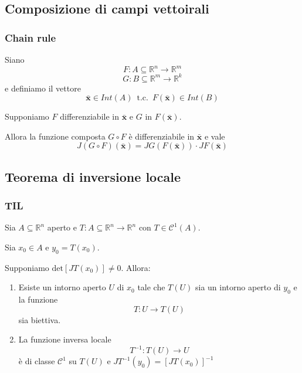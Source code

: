 \documentclass[x11names]{article}
\begin{document}
	\subsection{Composizione di campi vettoirali}
	\begin{center}
		\colorbox{myred}{\begin{minipage}{5.75in}
				\begin{redes}{}
					\subsubsection{\textbf{Chain rule}}
					Siano 
					\[
					F:A\subseteq \mathbb{R}^n \to \mathbb{R}^m
					\]
					\[
					G:B\subseteq \mathbb{R}^m \to \mathbb{R}^k
					\]
					e definiamo il vettore
					\[ 
					\boldsymbol{\bar{x}} \in Int(A) \;\ \text{t.c.} \;\ F(\boldsymbol{\bar{x}}) \in Int(B)
					\]
					
					Supponiamo \(F\) differenziabile in \(\boldsymbol{\bar{x}}\) e \(G\) in \(F(\boldsymbol{\bar{x}})\).
					
					Allora la funzione composta \(G\circ F\) è differenziabile in \(\boldsymbol{\bar{x}}\) e vale
					\[ 
					J(G\circ F)(\boldsymbol{\bar{x}}) = JG(F(\boldsymbol{\bar{x}})) \cdot JF(\boldsymbol{\bar{x}})
					\]
				\end{redes}
		\end{minipage}}        
	\end{center}

	\subsection{Teorema di inversione locale}
	\begin{center}
		\colorbox{myred}{\begin{minipage}{5.75in}
				\begin{redes}{}
					\subsubsection{\textbf{TIL}}
					Sia \(A \subseteq \mathbb{R}^n\) aperto e \(T:A\subseteq \mathbb{R}^n \to \mathbb{R}^n\) con \(T\in \mathcal{C}^1(A)\). 
					
					Sia \(x_{0} \in A\) e \(y_{0} = T(x_{0})\).
					
					Supponiamo \(\text{det}\left[JT(x_{0})\right] \neq 0\). Allora:
					\begin{enumerate}
						\item Esiste un intorno aperto \(U\) di \(x_{0}\) tale che \(T(U)\) sia un intorno aperto di \(y_{0}\) e la funzione
						\[ 
						T: U \to T(U)
						\]
						sia biettiva.
						\item La funzione inversa locale 
						\[ 
						T^{-1}: T(U) \to U
						\]
						è di classe \(\mathcal{C}^1\) su \(T(U)\) e \(JT^{-1}(y_{0}) = \left[JT(x_{0})\right]^{-1}\)
					\end{enumerate}
				\end{redes}
		\end{minipage}}        
	\end{center}
\end{document}
